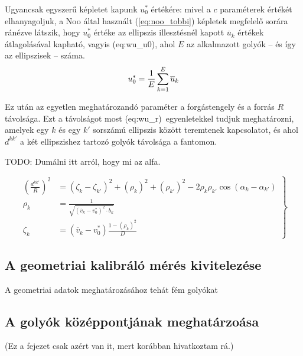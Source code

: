 \documentclass[a4paper,12pt,twoside]{article}
\begin{document}
Ugyancsak egyszerű képletet kapunk $u_0^*$ értékére: mivel a $c$ paraméterek értékét elhanyagoljuk, a Noo által használt (\ref{eq:noo_tobbi}) képletek megfelelő sorára ránézve látszik, hogy $u_0^*$ értéke az ellipszis illesztésnél kapott $\overline{u}_k$ értékek átlagolásával kapható, vagyis  \aref({eq:wu_u0}), ahol $E$ az alkalmazott golyók -- és így az ellipszisek -- száma. 
\begin{equation}
\label{eq:wu_u0}
u_0^* = \frac{1}{E} \sum_{k=1}^E \overline{u}_k\\
\end{equation}


Ez után az egyetlen meghatározandó paraméter a forgástengely és a forrás $R$ távolsága. Ezt a távolságot most \aref({eq:wu_r})~egyenletekkel tudjuk meghatározni, amelyek egy $k$ és egy $k'$ sorszámú ellipszis között teremtenek kapcsolatot, és ahol $d^{kk'}$ a két  ellipszishez tartozó golyók távolsága a fantomon. 

TODO: Dumálni itt arról, hogy mi az alfa.


\begin{equation}
\label{eq:wu_r}
\left .
\begin{split}
\left( \frac{d^{kk'}}{R} \right) ^2 & = \left ( \zeta_k - \zeta_{k'}  \right )^2  +  \left (\rho_{k} \right )^2 + \left (\rho_{k'} \right )^2  - 2\rho_k \rho_{k'} \cos  \left ( \alpha_k - \alpha_{k'} \right ) \\
\rho_k &= \frac{1}{\sqrt{\left (\overline{v}_k - v_0^* \right)^2 \cdot b_k}}\\
\zeta_k &= \left ( \overline{v}_k  - v_0^* \right ) \frac{ 1- \left( \rho_k \right) ^2 }{D} 
\end{split}
\right\}
\end{equation}


\subsection{A geometriai kalibráló mérés kivitelezése}

A geometriai adatok meghatározásához tehát fém golyókat 




\subsection{A golyók középpontjának meghatárzoása}
\label{sec:kozeppont}
(Ez a fejezet csak azért van it, mert korábban hivatkoztam rá.)

\clearpage
\end{document}
